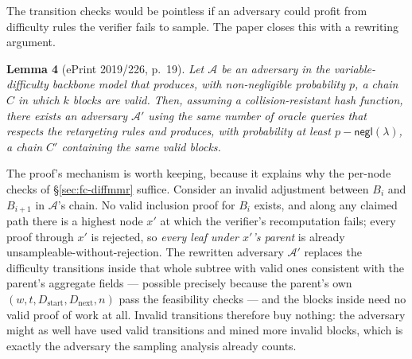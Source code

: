 \documentclass[11pt,a4paper]{article}
\theoremstyle{definition}
\newcommand{\negl}{\mathsf{negl}}
\newcommand{\Adv}{\mathcal{A}}
\begin{document}
The transition checks would be pointless if an adversary could profit from
difficulty rules the verifier fails to sample. The paper closes this with a
rewriting argument.

\medskip
\noindent\textbf{Lemma 4} (ePrint 2019/226, p.~19). \emph{Let $\Adv$ be an
adversary in the variable-difficulty backbone model that produces, with
non-negligible probability $p$, a chain $C$ in which $k$ blocks are valid.
Then, assuming a collision-resistant hash function, there exists an
adversary $\Adv'$ using the same number of oracle queries that respects the
retargeting rules and produces, with probability at least
$p - \negl(\lambda)$, a chain $C'$ containing the same valid blocks.}
\medskip

The proof's mechanism is worth keeping, because it explains why the
per-node checks of \S\ref{sec:fc-diffmmr} suffice. Consider an invalid
adjustment between $B_i$ and $B_{i+1}$ in $\Adv$'s chain. No valid
inclusion proof for $B_i$ exists, and along any claimed path there is a
highest node $x'$ at which the verifier's recomputation fails; every proof
through $x'$ is rejected, so \emph{every leaf under $x'$'s parent} is
already unsampleable-without-rejection. The rewritten adversary $\Adv'$
replaces the difficulty transitions inside that whole subtree with valid
ones consistent with the parent's aggregate fields --- possible precisely
because the parent's own $(w, t, D_{\mathrm{start}}, D_{\mathrm{next}}, n)$
pass the feasibility checks --- and the blocks inside need no valid proof
of work at all. Invalid transitions therefore buy nothing: the adversary
might as well have used valid transitions and mined more invalid blocks,
which is exactly the adversary the sampling analysis already counts.
\end{document}
